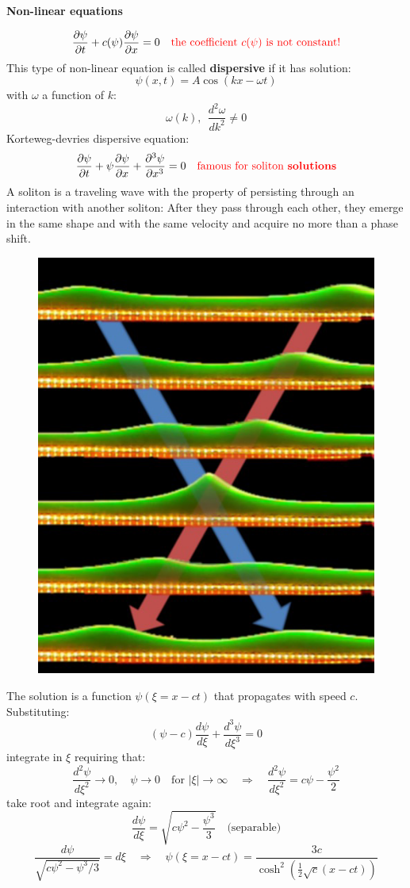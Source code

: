 \documentclass{article}
\begin{document}
\noindent
\textbf{Non-linear equations}

\begin{equation}
    \frac{\partial \psi}{\partial t} + c(\psi) \frac{\partial \psi}{\partial x} = 0 \quad \textcolor{red}{\text{the coefficient $c(\psi$) is not constant!}}
\end{equation}
This type of non-linear equation is called \textbf{dispersive} if it has solution:
\begin{equation}
    \psi (x,t) = A\cos (kx-\omega t)
\end{equation}
with $\omega$ a function of $k$:
\begin{equation}
    \omega (k) , \ \ \frac{d^2 \omega}{d k^2} \neq 0
\end{equation}
Korteweg-devries dispersive equation:
\begin{equation}
    \frac{\partial \psi}{\partial t} + \psi \frac{\partial \psi}{\partial x} + \frac{\partial^3 \psi}{\partial x^3} = 0 \quad \textcolor{red}{\text{famous for soliton } \textbf{solutions}}
\end{equation}
A soliton is a traveling wave with the property of persisting through an interaction with another soliton: After they pass through each other, they emerge in the same shape and with the same velocity and acquire no more than a phase shift.

\begin{figure}[h]
    \centering
    \includegraphics[width=0.25\linewidth]{fig60.png}
\end{figure}

\newpage

\noindent
The solution is a function $\psi (\xi = x - ct)$ that propagates with speed $c$. Substituting:
\begin{equation}
    (\psi - c) \frac{d \psi}{d \xi} + \frac{d^3 \psi}{d \xi^3} = 0
\end{equation}
integrate in $\xi$ requiring that:
\begin{equation}
    \frac{d^2 \psi}{d \xi^2} \to 0, \quad \psi \to 0 \quad \text{for } |\xi| \to \infty \quad \Rightarrow \quad \frac{d^2 \psi}{d \xi^2} = c \psi - \frac{\psi^2}{2}
\end{equation}
take root and integrate again:
\begin{equation}
    \frac{d \psi}{d \xi} = \sqrt{c \psi^2 - \frac{\psi^3}{3}} \quad \text{(separable)}
\end{equation}
\begin{equation}
    \frac{d\psi}{\sqrt{c \psi^2 - \psi^3/3}} = d\xi
\quad \Rightarrow \quad
\psi\left( \xi = x - ct \right) =
\frac{3c}{\cosh^2\left( \frac{1}{2} \sqrt{c} (x - ct) \right)}
\end{equation}
\end{document}

